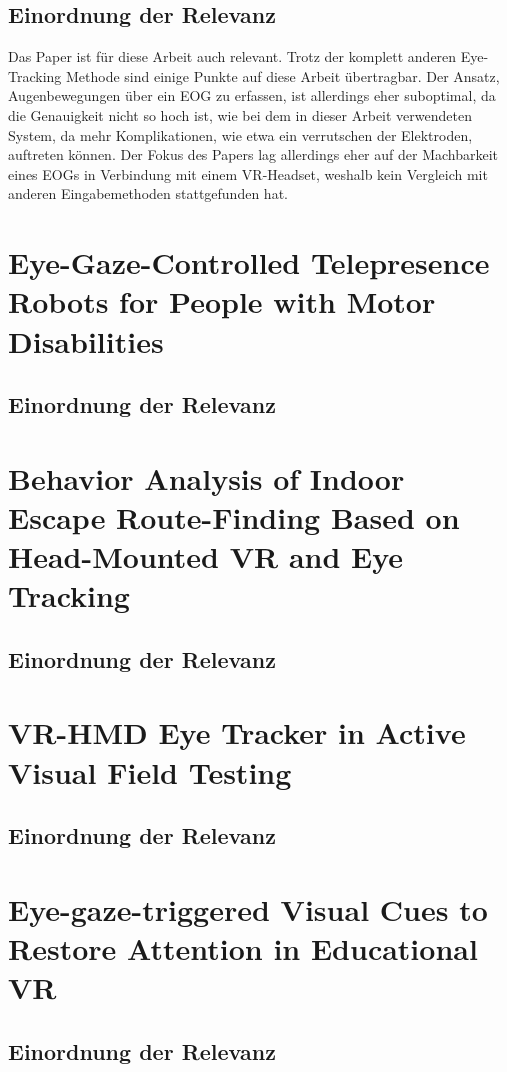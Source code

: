 \subsection{Einordnung der Relevanz}
Das Paper ist für diese Arbeit auch relevant. Trotz der komplett anderen Eye-Tracking Methode sind einige Punkte auf diese Arbeit übertragbar. Der Ansatz, Augenbewegungen über ein EOG zu erfassen, ist allerdings eher suboptimal, da die Genauigkeit nicht so hoch ist, wie bei dem in dieser Arbeit verwendeten System, da mehr Komplikationen, wie etwa ein verrutschen der Elektroden, auftreten können. Der Fokus des Papers lag allerdings eher auf der Machbarkeit eines EOGs in Verbindung mit einem VR-Headset, weshalb kein Vergleich mit anderen Eingabemethoden stattgefunden hat. 

\section{Eye-Gaze-Controlled Telepresence Robots for People with Motor Disabilities}

\subsection{Einordnung der Relevanz}

\section{Behavior Analysis of Indoor Escape Route-Finding Based on Head-Mounted VR and Eye Tracking}

\subsection{Einordnung der Relevanz}

\section{VR-HMD Eye Tracker in Active Visual Field Testing}

\subsection{Einordnung der Relevanz}

\section{Eye-gaze-triggered Visual Cues to Restore Attention in Educational VR}

\subsection{Einordnung der Relevanz}

